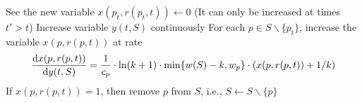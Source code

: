
\begin{algorithm}
\begin{algorithmic}[1]
    \State See the new variable $x( p_t, r(p_t,t) ) \leftarrow 0$ (It can only be increased at times $t' > t$)
        \State Increase variable $y(t,S)$ continuously
        \State For each $p \in S \backslash \{p_t\}$, increase the variable $x(p,r(p,t))$ at rate
        \begin{align*}
            \frac{ \mathrm{d} x(p, r(p,t)) }{ \mathrm{d} y (t,S) } = \frac{1}{c_p} \cdot \ln (k+1) \cdot \min \{ w(S) - k, w_p \} \cdot ( x(p, r(p,t)) + 1/k )
        \end{align*}
        \State If $x(p, r(p,t)) = 1$, then remove $p$ from $S$, i.e., $S \leftarrow S \backslash \{p \}$
    \Else
        \State
    \EndIf
\EndProcedure
\end{algorithmic}
\end{algorithm}